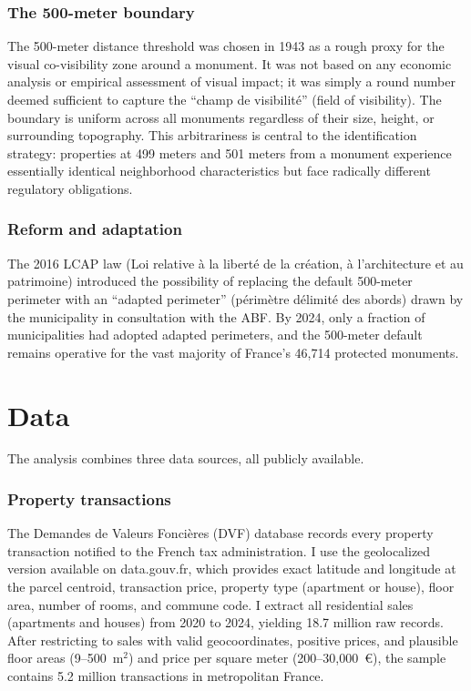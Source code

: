 \documentclass[12pt]{article}
\begin{document}
\subsubsection*{The 500-meter boundary} The 500-meter distance threshold was chosen in 1943 as a rough proxy for the visual co-visibility zone around a monument. It was not based on any economic analysis or empirical assessment of visual impact; it was simply a round number deemed sufficient to capture the ``champ de visibilit\'{e}'' (field of visibility). The boundary is uniform across all monuments regardless of their size, height, or surrounding topography. This arbitrariness is central to the identification strategy: properties at 499 meters and 501 meters from a monument experience essentially identical neighborhood characteristics but face radically different regulatory obligations.

\subsubsection*{Reform and adaptation} The 2016 LCAP law (Loi relative \`{a} la libert\'{e} de la cr\'{e}ation, \`{a} l'architecture et au patrimoine) introduced the possibility of replacing the default 500-meter perimeter with an ``adapted perimeter'' (p\'{e}rim\`{e}tre d\'{e}limit\'{e} des abords) drawn by the municipality in consultation with the ABF. By 2024, only a fraction of municipalities had adopted adapted perimeters, and the 500-meter default remains operative for the vast majority of France's 46,714 protected monuments.

\section{Data}

The analysis combines three data sources, all publicly available.

\subsubsection*{Property transactions} The Demandes de Valeurs Fonci\`{e}res (DVF) database records every property transaction notified to the French tax administration. I use the geolocalized version available on data.gouv.fr, which provides exact latitude and longitude at the parcel centroid, transaction price, property type (apartment or house), floor area, number of rooms, and commune code. I extract all residential sales (apartments and houses) from 2020 to 2024, yielding 18.7 million raw records. After restricting to sales with valid geocoordinates, positive prices, and plausible floor areas (9--500~m$^2$) and price per square meter (200--30,000~\euro), the sample contains 5.2 million transactions in metropolitan France.
\end{document}
